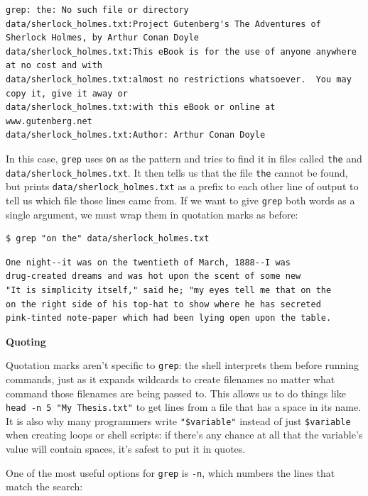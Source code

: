 \documentclass[
]{krantz}
\renewenvironment{quote}{\begin{VF}}{\end{VF}}
\begin{document}
\begin{verbatim}
grep: the: No such file or directory
data/sherlock_holmes.txt:Project Gutenberg's The Adventures of Sherlock Holmes, by Arthur Conan Doyle
data/sherlock_holmes.txt:This eBook is for the use of anyone anywhere at no cost and with
data/sherlock_holmes.txt:almost no restrictions whatsoever.  You may copy it, give it away or
data/sherlock_holmes.txt:with this eBook or online at www.gutenberg.net
data/sherlock_holmes.txt:Author: Arthur Conan Doyle
\end{verbatim}

In this case,
\texttt{grep} uses \texttt{on} as the pattern
and tries to find it in files called \texttt{the} and \texttt{data/sherlock\_holmes.txt}.
It then tells us that the file \texttt{the} cannot be found,
but prints \texttt{data/sherlock\_holmes.txt} as a prefix to each other line of output
to tell us which file those lines came from.
If we want to give \texttt{grep} both words as a single argument,
we must wrap them in quotation marks as before:

\begin{verbatim}
$ grep "on the" data/sherlock_holmes.txt
\end{verbatim}

\begin{verbatim}
One night--it was on the twentieth of March, 1888--I was
drug-created dreams and was hot upon the scent of some new
"It is simplicity itself," said he; "my eyes tell me that on the
on the right side of his top-hat to show where he has secreted
pink-tinted note-paper which had been lying open upon the table.
\end{verbatim}

\begin{quote}
\textbf{Quoting}

Quotation marks aren't specific to \texttt{grep}:
the shell interprets them before running commands,
just as it expands wildcards to create filenames
no matter what command those filenames are being passed to.
This allows us to do things like \texttt{head\ -n\ 5\ "My\ Thesis.txt"}
to get lines from a file that has a space in its name.
It is also why many programmers write \texttt{"\$variable"} instead of just \texttt{\$variable}
when creating loops or shell scripts:
if there's any chance at all that the variable's value will contain spaces,
it's safest to put it in quotes.
\end{quote}

One of the most useful options for \texttt{grep} is \texttt{-n},
which numbers the lines that match the search:
\end{document}
